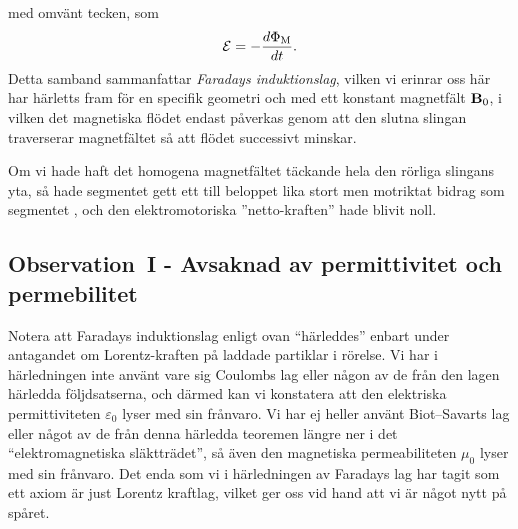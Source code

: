 {{{{med omv{\"a}nt tecken, som
$$
  {\cal E}=-{{d\Phi_{\rm M}}\over{dt}}.
$$
Detta samband sammanfattar {\it Faradays induktionslag},
vilken vi erinrar oss h{\"a}r har h{\"a}rletts fram f{\"o}r en specifik
geometri och med ett konstant magnetf{\"a}lt ${\bf B}_0$, i vilken det
magnetiska fl{\"o}det endast p{\aa}verkas genom att den slutna slingan
traverserar magnetf{\"a}ltet s{\aa} att fl{\"o}det successivt minskar.

Om vi hade haft det homogena magnetf{\"a}ltet t{\"a}ckande hela den r{\"o}rliga
slingans yta, s{\aa} hade segmentet  gett ett till beloppet lika
stort men motriktat bidrag som segmentet , och den elektromotoriska
''netto-kraften'' hade blivit noll.
\vfill\eject

\subsection{Observation~I - Avsaknad av permittivitet och permebilitet}
Notera att Faradays induktionslag enligt ovan
``h{\"a}rleddes''
enbart under antagandet om Lorentz-kraften p{\aa} laddade partiklar i
r{\"o}relse.
Vi har i h{\"a}rledningen inte anv{\"a}nt vare sig Coulombs lag eller n{\aa}gon
av de fr{\aa}n den lagen h{\"a}rledda f{\"o}ljdsatserna, och d{\"a}rmed kan vi
konstatera att den elektriska permittiviteten $\varepsilon_0$ lyser med sin
fr{\aa}nvaro.
Vi har ej heller anv{\"a}nt Biot--Savarts lag eller n{\aa}got av de fr{\aa}n
denna h{\"a}rledda teoremen l{\"a}ngre ner i det ``elektromagnetiska
sl{\"a}kttr{\"a}det'', s{\aa} {\"a}ven den magnetiska permeabiliteten $\mu_0$
lyser med sin fr{\aa}nvaro.
Det enda som vi i h{\"a}rledningen av Faradays lag har tagit som ett axiom
{\"a}r just Lorentz kraftlag, vilket ger oss vid hand att vi {\"a}r n{\aa}got
nytt p{\aa} sp{\aa}ret.

}}}}
